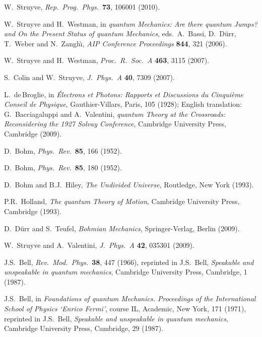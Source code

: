 \documentclass[12pt]{article}
\begin{document}
\begin{thebibliography}{10}

{W.\ Struyve, {\em Rep.\ Prog.\ Phys.}\ {\bf 73}, 106001 (2010).}

{W.\ Struyve and H.\ Westman, in {\em quantum Mechanics: Are there quantum Jumps? and On the Present Status of quantum Mechanics}, eds.\ A.\ Bassi, D.\ D\"urr, T.\ Weber  and N.\ Zangh\`\i, {\em AIP Conference Proceedings} {\bf 844}, 321 (2006).}

{W.\ Struyve and H.\ Westman, {\em Proc.\ R.\ Soc.\ A} {\bf 463}, 3115 (2007).}

{S.\ Colin and W.\ Struyve, {\em J.\ Phys.\ A} {\bf 40}, 7309 (2007).}

{L.\ de$\,$Broglie, in {\em \'Electrons et Photons: Rapports et Discussions du
  Cinqui\`eme Conseil de Physique}, Gauthier-Villars, Paris, 105 (1928);
  English translation: G.\ Bacciagaluppi and A.\ Valentini, {\em quantum Theory
  at the Crossroads: Reconsidering the 1927 Solvay Conference}, Cambridge
  University Press, Cambridge (2009).}

{D.\ Bohm, {\em Phys.\ Rev.}\ {\bf 85}, 166 (1952).}

{D.\ Bohm, {\em Phys.\ Rev.}\ {\bf 85}, 180 (1952).}

{D.\ Bohm and B.J.\ Hiley, {\em The Undivided Universe}, Routledge, New York (1993).}

{P.R.\ Holland, {\em The quantum Theory of Motion}, Cambridge University Press, Cambridge (1993).}

{D.\ D\"urr and S.\ Teufel, {\em Bohmian Mechanics}, Springer-Verlag, Berlin (2009).}

{W.\ Struyve and A.\ Valentini, {\em J.\ Phys.\ A} {\bf 42}, 035301 (2009).}

{J.S.\ Bell, {\em  Rev.\ Mod.\ Phys.}\ {\bf 38}, 447 (1966), reprinted in J.S.\ Bell, {\em
  Speakable and unspeakable in quantum mechanics}, Cambridge University Press,
  Cambridge, 1 (1987).}

{J.S.\ Bell, in {\em  Foundations of quantum Mechanics. Proceedings of the International School of
  Physics `Enrico Fermi'}, course IL, Academic, New York, 171 (1971),
  reprinted in J.S.\ Bell, {\em Speakable and unspeakable in quantum
  mechanics}, Cambridge University Press, Cambridge, 29 (1987).}


\end{thebibliography}
\end{document}
